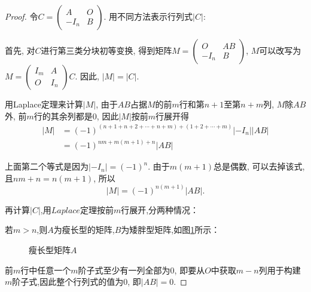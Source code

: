 \begin{proof}
  令$C=\left(\begin{smallmatrix}
      A & O\\
      -I_n & B \end{smallmatrix}\right)$.
  用不同方法表示行列式$|C|$:

  首先, 对$C$进行第三类分块初等变换, 得到矩阵$M=\left(\begin{smallmatrix}
      O & AB\\
      -I_n & B \end{smallmatrix}\right)$, $M$可以改写为
  $M = \left(\begin{smallmatrix}
      I_m & A\\
      O & I_n \end{smallmatrix}\right)C$. 
  因此, $|M| = |C|$. 

  用Laplace定理来计算$\left\vert M \right\vert$, 
  由于$AB$占据$M$的前$m$行和第$n+1$至第$n+m$列, 
  $M$除$AB$外, 前$m$行的其余列都是$0$, 因此$|M|$按前$m$行展开得
  \begin{align*}
    |M| & =(-1)^{(n+1+n+2+\cdots+n+m)+(1+2+\cdots+m)}|-I_n||AB|\\
        & =(-1)^{nm+m(m+1)+n}|AB|
  \end{align*}
  
  上面第二个等式是因为$|-I_n|=(-1)^n$. 
  由于$m(m+1)$总是偶数, 可以去掉该式, 且$nm+n=n(m+1)$, 所以
  \begin{equation}\label{eq:5}
    |M|=(-1)^{n(m+1)}|AB|.
  \end{equation}  

  再计算$|C|$,用$Laplace$定理按前$m$行展开,分两种情况：

  若$m > n$,则$A$为瘦长型的矩阵,$B$为矮胖型矩阵,如图\ref{fig:1}所示：\\
  \begin{figure}[!ht]
   \begin{center}
  \end{center}
  \caption{瘦长型矩阵$A$\label{fig:1}}
\end{figure}  前$m$行中任意一个$m$阶子式至少有一列全部为$0$,
即要从$O$中获取$m-n$列用于构建$m$阶子式,因此整个行列式的值为$0$,
即$|AB|=0$.


\end{proof}
